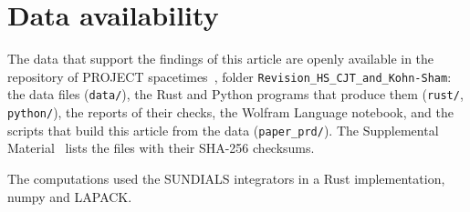 \documentclass[aps,prd,twocolumn,superscriptaddress,nofootinbib,floatfix,longbibliography]{revtex4-2}
\begin{document}
\section*{Data availability}

The data that support the findings of this article are openly available in the repository of PROJECT
spacetimes~\cite{Repo}, folder \texttt{Revision\_HS\_CJT\_and\_Kohn-Sham}: the data files (\texttt{data/}), the Rust and Python
programs that produce them (\texttt{rust/}, \texttt{python/}), the reports of their checks, the Wolfram Language notebook, and
the scripts that build this article from the data (\texttt{paper\_prd/}). The Supplemental Material~\cite{SM} lists the files
with their SHA-256 checksums.

\begin{acknowledgments}
The computations used the SUNDIALS integrators in a Rust implementation, numpy and LAPACK.
\end{acknowledgments}


\end{document}

